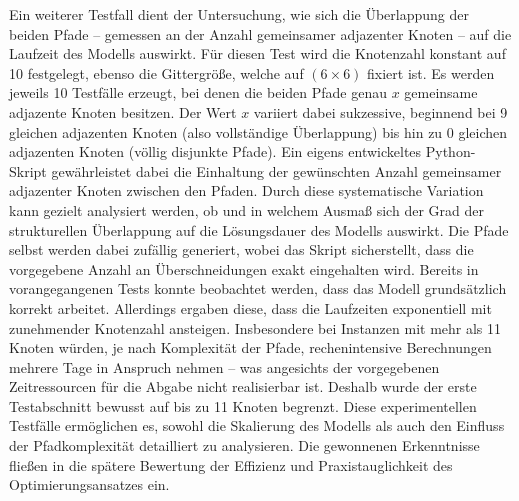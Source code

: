 \documentclass[bachelor, german]{algothesis}
\begin{document}
Ein weiterer Testfall dient der Untersuchung, wie sich die Überlappung der beiden Pfade – gemessen an der Anzahl gemeinsamer adjazenter Knoten – auf die Laufzeit des Modells auswirkt. Für diesen Test wird die Knotenzahl konstant auf 10 festgelegt, ebenso die Gittergröße, welche auf $(6 \times 6)$ fixiert ist. Es werden jeweils 10 Testfälle erzeugt, bei denen die beiden Pfade genau $x$ gemeinsame adjazente Knoten besitzen. Der Wert $x$ variiert dabei sukzessive, beginnend bei 9 gleichen adjazenten Knoten (also vollständige Überlappung) bis hin zu 0 gleichen adjazenten Knoten (völlig disjunkte Pfade). Ein eigens entwickeltes Python-Skript gewährleistet dabei die Einhaltung der gewünschten Anzahl gemeinsamer adjazenter Knoten zwischen den Pfaden. Durch diese systematische Variation kann gezielt analysiert werden, ob und in welchem Ausmaß sich der Grad der strukturellen Überlappung auf die Lösungsdauer des Modells auswirkt. Die Pfade selbst werden dabei zufällig generiert, wobei das Skript sicherstellt, dass die vorgegebene Anzahl an Überschneidungen exakt eingehalten wird.
\newline
Bereits in vorangegangenen Tests konnte beobachtet werden, dass das Modell grundsätzlich korrekt arbeitet. Allerdings ergaben diese, dass die Laufzeiten exponentiell mit zunehmender Knotenzahl ansteigen. Insbesondere bei Instanzen mit mehr als 11 Knoten würden, je nach Komplexität der Pfade, rechenintensive Berechnungen mehrere Tage in Anspruch nehmen – was angesichts der vorgegebenen Zeitressourcen für die Abgabe nicht realisierbar ist. Deshalb wurde der erste Testabschnitt bewusst auf bis zu 11 Knoten begrenzt.\newline
Diese experimentellen Testfälle ermöglichen es, sowohl die Skalierung des Modells als auch den Einfluss der Pfadkomplexität detailliert zu analysieren. Die gewonnenen Erkenntnisse fließen in die spätere Bewertung der Effizienz und Praxistauglichkeit des Optimierungsansatzes ein.
\end{document}
